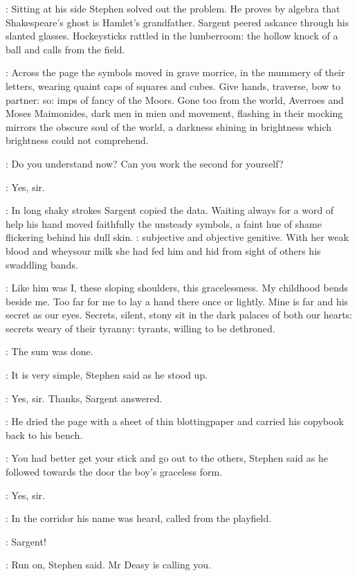 :
Sitting at his side Stephen solved out the problem. He proves by
algebra that Shakespeare's ghost is Hamlet's grandfather. Sargent peered
askance through his slanted glasses. Hockeysticks rattled in the
lumberroom: the hollow knock of a ball and calls from the field.

\StephenInt:
Across the page the symbols moved in grave morrice, in the mummery
of their letters, wearing quaint caps of squares and cubes. Give hands,
traverse, bow to partner: so: imps of fancy of the Moors. Gone too from
the world, Averroes and Moses Maimonides, dark men in mien and
movement, flashing in their mocking mirrors the obscure soul of the
world, a darkness shining in brightness which brightness could not
comprehend.

\Stephen:
Do you understand now? Can you work the second for yourself?

\sargent:
Yes, sir.

:
In long shaky strokes Sargent copied the data. Waiting always for a
word of help his hand moved faithfully the unsteady symbols, a faint hue
of shame flickering behind his dull skin.
: subjective and
objective genitive. With her weak blood and wheysour milk she had fed him
and hid from sight of others his swaddling bands.

\StephenInt:
Like him was I, these sloping shoulders, this gracelessness. My
childhood bends beside me. Too far for me to lay a hand there once or
lightly. Mine is far and his secret as our eyes. Secrets, silent, stony
sit in the dark palaces of both our hearts: secrets weary of their
tyranny: tyrants, willing to be dethroned.

:
The sum was done.

\Stephen:
It is very simple, Stephen said as he stood up.

\sargent:
Yes, sir. Thanks, Sargent answered.

:
He dried the page with a sheet of thin blottingpaper and carried his
copybook back to his bench.

\Stephen:
You had better get your stick and go out to the others, Stephen said as
he followed towards the door the boy's graceless form.

\sargent:
Yes, sir.

:
In the corridor his name was heard, called from the playfield.

\deasy:
Sargent!

\Stephen:
Run on, Stephen said. Mr Deasy is calling you.

